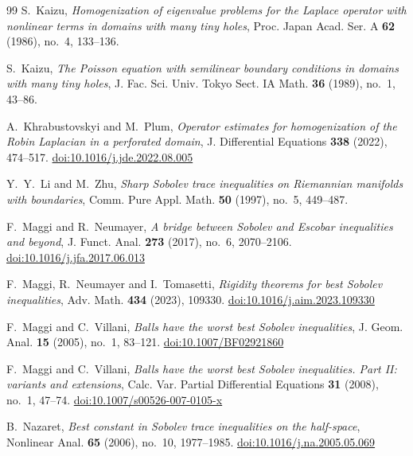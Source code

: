 \documentclass[11pt,reqno]{amsart}
\theoremstyle{plain}
\theoremstyle{definition}
\begin{document}
\begin{thebibliography}{99}
S.~Kaizu,
\emph{Homogenization of eigenvalue problems for the Laplace operator with nonlinear
terms in domains with many tiny holes},
Proc. Japan Acad. Ser. A \textbf{62} (1986), no.~4, 133--136.

S.~Kaizu,
\emph{The Poisson equation with semilinear boundary conditions in domains with many
tiny holes},
J. Fac. Sci. Univ. Tokyo Sect. IA Math. \textbf{36} (1989), no.~1, 43--86.

A.~Khrabustovskyi and M.~Plum,
\emph{Operator estimates for homogenization of the Robin Laplacian in a perforated
domain},
J. Differential Equations \textbf{338} (2022), 474--517.
\href{https://doi.org/10.1016/j.jde.2022.08.005}{doi:10.1016/j.jde.2022.08.005}

Y.~Y.~Li and M.~Zhu,
\emph{Sharp Sobolev trace inequalities on Riemannian manifolds with boundaries},
Comm. Pure Appl. Math. \textbf{50} (1997), no.~5, 449--487.

F.~Maggi and R.~Neumayer,
\emph{A bridge between Sobolev and Escobar inequalities and beyond},
J. Funct. Anal. \textbf{273} (2017), no.~6, 2070--2106.
\href{https://doi.org/10.1016/j.jfa.2017.06.013}{doi:10.1016/j.jfa.2017.06.013}

F.~Maggi, R.~Neumayer and I.~Tomasetti,
\emph{Rigidity theorems for best Sobolev inequalities},
Adv. Math. \textbf{434} (2023), 109330.
\href{https://doi.org/10.1016/j.aim.2023.109330}{doi:10.1016/j.aim.2023.109330}

F.~Maggi and C.~Villani,
\emph{Balls have the worst best Sobolev inequalities},
J. Geom. Anal. \textbf{15} (2005), no.~1, 83--121.
\href{https://doi.org/10.1007/BF02921860}{doi:10.1007/BF02921860}

F.~Maggi and C.~Villani,
\emph{Balls have the worst best Sobolev inequalities. Part II: variants and
extensions},
Calc. Var. Partial Differential Equations \textbf{31} (2008), no.~1, 47--74.
\href{https://doi.org/10.1007/s00526-007-0105-x}{doi:10.1007/s00526-007-0105-x}

B.~Nazaret,
\emph{Best constant in Sobolev trace inequalities on the half-space},
Nonlinear Anal. \textbf{65} (2006), no.~10, 1977--1985.
\href{https://doi.org/10.1016/j.na.2005.05.069}{doi:10.1016/j.na.2005.05.069}

\end{thebibliography}
\end{document}
